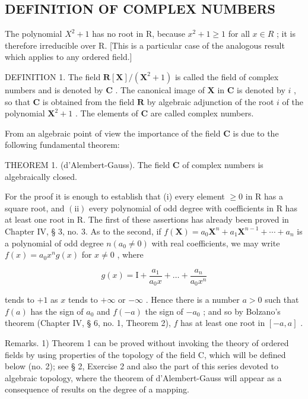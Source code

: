 \subsection{DEFINITION OF COMPLEX NUMBERS}

The polynomial \(X^{2} + 1\) has no root in R, because \(x^{2} + 1 \geqslant 1\) for all \(x \in R\) ; it is therefore irreducible over R. {[}This is a particular case of the analogous result which applies to any ordered field.{]}

DEFINITION 1. The field \(\mathbf{R}[\mathbf{X}] / (\mathbf{X}^2 + 1)\) is called the field of complex numbers and is denoted by \(\mathbf{C}\) . The canonical image of \(\mathbf{X}\) in \(\mathbf{C}\) is denoted by \(i\) , so that \(\mathbf{C}\) is obtained from the field \(\mathbf{R}\) by algebraic adjunction of the root \(i\) of the polynomial \(\mathbf{X}^2 + 1\) . The elements of \(\mathbf{C}\) are called complex numbers.

From an algebraic point of view the importance of the field \(\mathbf{C}\) is due to the following fundamental theorem:

THEOREM 1. (d'Alembert-Gauss). The field \(\mathbf{C}\) of complex numbers is algebraically closed.

For the proof it is enough to establish that (i) every element \(\geqslant0\) in R has a square root, and \((\mathrm{ii})\) every polynomial of odd degree with coefficients in R has at least one root in R. The first of these assertions has already been proved in Chapter IV, § 3, no. 3. As to the second, if \(f(\mathbf{X}) = a_{0}\mathbf{X}^{n} + a_{1}\mathbf{X}^{n-1} + \cdots + a_{n}\) is a polynomial of odd degree \(n(a_{0} \neq 0)\) with real coefficients, we may write \(f(x) = a_{0}x^{n}g(x)\) for \(x \neq 0\) , where

\[
g (x) = \mathrm{I} + \frac {a _ {1}}{a _ {0} x} + \dots + \frac {a _ {n}}{a _ {0} x ^ {n}}
\]

tends to \(+1\) as \(x\) tends to \(+\infty\) or \(-\infty\) . Hence there is a number \(a > 0\) such that \(f(a)\) has the sign of \(a_0\) and \(f(-a)\) the sign of \(-a_0\) ;
and so by Bolzano's theorem (Chapter IV, § 6, no. 1, Theorem 2), \(f\) has at least one root in \([-a, a]\) .

Remarks. 1) Theorem 1 can be proved without invoking the theory of ordered fields by using properties of the topology of the field C, which will be defined below (no. 2); see § 2, Exercise 2 and also the part of this series devoted to algebraic topology, where the theorem of d'Alembert-Gauss will appear as a consequence of results on the degree of a mapping.

